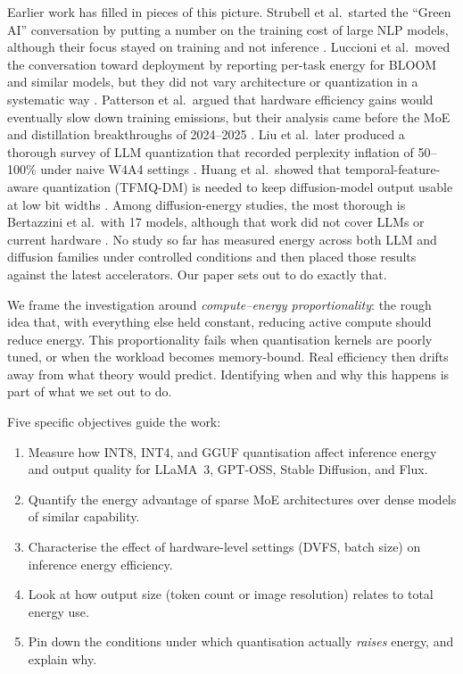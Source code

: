 \documentclass[AMS,STIX2COL]{WileyNJD-v2}
\begin{document}
Earlier work has filled in pieces of this picture. Strubell et al.\ started the ``Green AI'' conversation by putting a number on the training cost of large NLP models, although their focus stayed on training and not inference \cite{strubell2019energy}. Luccioni et al.\ moved the conversation toward deployment by reporting per-task energy for BLOOM and similar models, but they did not vary architecture or quantization in a systematic way \cite{luccioni2023power, luccioni2024power}. Patterson et al.\ argued that hardware efficiency gains would eventually slow down training emissions, but their analysis came before the MoE and distillation breakthroughs of 2024--2025 \cite{patterson2022carbon}. Liu et al.\ later produced a thorough survey of LLM quantization that recorded perplexity inflation of 50--100\% under naive W4A4 settings \cite{liu2024survey}. Huang et al.\ showed that temporal-feature-aware quantization (TFMQ-DM) is needed to keep diffusion-model output usable at low bit widths \cite{huang2024tfmqdm}. Among diffusion-energy studies, the most thorough is Bertazzini et al.\ with 17 models, although that work did not cover LLMs or current hardware \cite{bertazzini2025hidden}. No study so far has measured energy across both LLM and diffusion families under controlled conditions and then placed those results against the latest accelerators. Our paper sets out to do exactly that.

We frame the investigation around \textit{compute--energy proportionality}: the rough idea that, with everything else held constant, reducing active compute should reduce energy. This proportionality fails when quantisation kernels are poorly tuned, or when the workload becomes memory-bound. Real efficiency then drifts away from what theory would predict. Identifying when and why this happens is part of what we set out to do.

Five specific objectives guide the work:
\begin{enumerate}
\item Measure how INT8, INT4, and GGUF quantisation affect inference energy and output quality for LLaMA~3, GPT-OSS, Stable Diffusion, and Flux.
\item Quantify the energy advantage of sparse MoE architectures over dense models of similar capability.
\item Characterise the effect of hardware-level settings (DVFS, batch size) on inference energy efficiency.
\item Look at how output size (token count or image resolution) relates to total energy use.
\item Pin down the conditions under which quantisation actually \textit{raises} energy, and explain why.
\end{enumerate}
\end{document}
